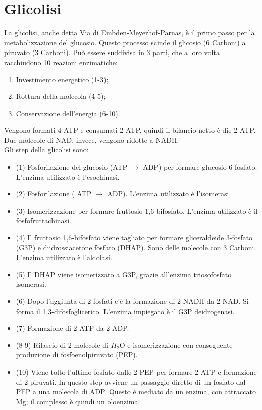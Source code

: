 \section{Glicolisi}
La glicolisi, anche detta Via di Embden-Meyerhof-Parnas, \`e il primo passo per la metabolizzazione del glucosio. Questo processo scinde il glicosio (6 Carboni) a piruvato (3 Carboni). Pu\`o essere suddivisa in 3 parti, che a loro volta racchiudono 10 reazioni enzimatiche:
\begin{enumerate}
    \item Investimento energetico (1-3);
    \item Rottura della molecola (4-5);
    \item Conservazione dell'energia (6-10).
\end{enumerate}
Vengono formati 4 ATP e consumati 2 ATP, quindi il bilancio netto \`e die 2 ATP. Due molecole di NAD\ap{+}, invece, vengono ridotte a NADH.
\\Gli step della glicolisi sono:
\begin{itemize}
    \item (1) Fosforilazione del glucosio (ATP $\xrightarrow{}$ ADP) per formare glucosio-6-fosfato. L'enzima utilizzato \`e l'esochinasi.
    \item (2) Fosforilazione ( ATP $\xrightarrow{}$ ADP). L'enzima utilizzato \`e l'isomerasi.
    \item (3) Isomerizzazione per formare fruttosio 1,6-bifosfato. L'enzima utilizzato \`e il fosfofruttachinasi.
    \item (4) Il fruttosio 1,6-bifosfato viene tagliato per formare gliceraldeide 3-fosfato (G3P) e diidrossiacetone fosfato (DHAP). Sono delle molecole con 3 Carboni. L'enzima utilizzato \`e l'aldolasi.
    \item (5) Il DHAP viene isomerizzato a G3P, grazie all'enzima triosofosfato isomerasi.
    \item (6) Dopo l'aggiunta di 2 fosfati c'è la formazione di 2 NADH da 2 NAD\ap{+}. Si forma il 1,3-difosfoglicerico. L'enzima impiegato \`e il G3P deidrogenasi.
    \item (7) Formazione di 2 ATP da 2 ADP.
    \item (8-9) Rilascio di 2 molecole di $H_2$O e isomerizzazione con conseguente produzione di fosfoenolpiruvato (PEP).
    \item (10) Viene tolto l'ultimo fosfato dalle 2 PEP per formare 2 ATP e formazione di 2 piruvati. In questo step avviene un passaggio diretto di un fosfato dal PEP a una molecola di ADP. Questo \`e mediato da un enzima, con attraccato Mg; il complesso \`e quindi un oloenzima.
\end{itemize}
